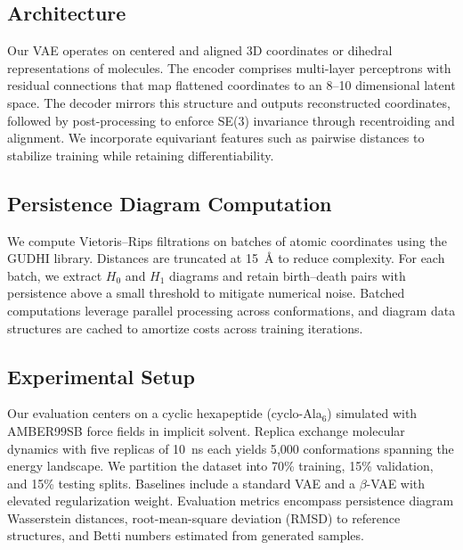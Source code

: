 \documentclass[11pt]{article}
\begin{document}
\subsection{Architecture}
Our VAE operates on centered and aligned 3D coordinates or dihedral representations of molecules. The encoder comprises multi-layer perceptrons with residual connections that map flattened coordinates to an 8--10 dimensional latent space. The decoder mirrors this structure and outputs reconstructed coordinates, followed by post-processing to enforce SE(3) invariance through recentroiding and alignment. We incorporate equivariant features such as pairwise distances to stabilize training while retaining differentiability.

\subsection{Persistence Diagram Computation}
We compute Vietoris--Rips filtrations on batches of atomic coordinates using the GUDHI library. Distances are truncated at 15~\AA{} to reduce complexity. For each batch, we extract $H_0$ and $H_1$ diagrams and retain birth--death pairs with persistence above a small threshold to mitigate numerical noise. Batched computations leverage parallel processing across conformations, and diagram data structures are cached to amortize costs across training iterations.

\subsection{Experimental Setup}
Our evaluation centers on a cyclic hexapeptide (cyclo-Ala$_6$) simulated with AMBER99SB force fields in implicit solvent. Replica exchange molecular dynamics with five replicas of 10~ns each yields 5{,}000 conformations spanning the energy landscape. We partition the dataset into 70\% training, 15\% validation, and 15\% testing splits. Baselines include a standard VAE and a $\beta$-VAE with elevated regularization weight. Evaluation metrics encompass persistence diagram Wasserstein distances, root-mean-square deviation (RMSD) to reference structures, and Betti numbers estimated from generated samples.
\end{document}

